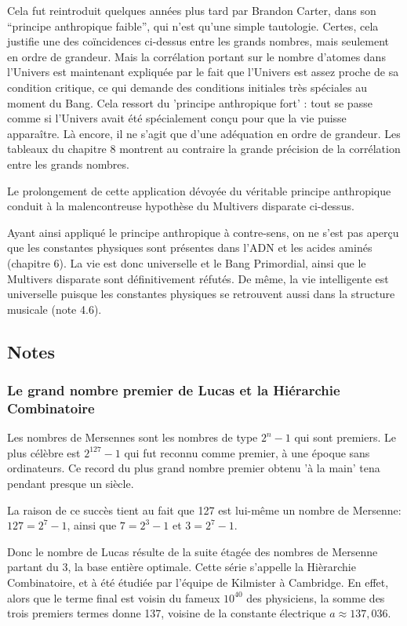 \documentclass[a4paper,12pt]{article}
\begin{document}
Cela fut reintroduit quelques années plus tard par Brandon Carter, dans son ``principe anthropique faible'', qui n'est qu'une simple tautologie. Certes, cela justifie une des coïncidences ci-dessus entre les grands nombres, mais seulement en ordre de grandeur. Mais la corrélation portant sur le nombre d'atomes dans l'Univers est maintenant expliquée par le fait que l'Univers est assez proche de sa condition critique, ce qui demande des conditions initiales très spéciales au moment du Bang. Cela ressort du 'principe anthropique fort' : tout se passe comme si l'Univers avait été spécialement conçu pour que la vie puisse apparaître. Là encore, il ne s'agit que d'une adéquation en ordre de grandeur. Les tableaux du chapitre 8 montrent au contraire la grande précision de la corrélation entre les grands nombres.

Le prolongement de cette application dévoyée du véritable principe anthropique conduit à la malencontreuse hypothèse du Multivers disparate ci-dessus.
 
Ayant ainsi appliqué le principe anthropique à contre-sens, on ne s'est pas aperçu que les constantes physiques sont présentes dans l'ADN et les acides aminés (chapitre 6).  La vie est donc universelle et le Bang Primordial, ainsi que le Multivers disparate sont définitivement réfutés. De même, la vie intelligente est universelle puisque les constantes physiques se retrouvent aussi dans la structure musicale (note 4.6).


\subsection{Notes}


\subsubsection{Le grand nombre premier de Lucas et la Hiérarchie Combinatoire} 

      Les nombres de Mersennes sont les nombres de type $2^n -1$ qui sont premiers. Le plus célèbre est $2^{127}-1$  qui fut reconnu comme premier, à une époque sans ordinateurs. Ce record du plus grand nombre premier obtenu 'à la main' tena pendant presque un siècle.

La raison de ce succès tient au fait que 127 est lui-même un nombre de Mersenne: $127 = 2^7 -1$, ainsi que $7 = 2^3-1$ et $3 = 2^7-1$. 

Donc le nombre de Lucas résulte de la suite étagée des nombres de Mersenne partant du 3, la base entière optimale. Cette série s'appelle la Hièrarchie Combinatoire, et à été étudiée par l'équipe de Kilmister à Cambridge. En effet, alors que le terme final est voisin du fameux $10^40$ des physiciens, la somme des trois premiers termes donne 137, voisine de la constante électrique $a \approx 137,036$.
\end{document}
